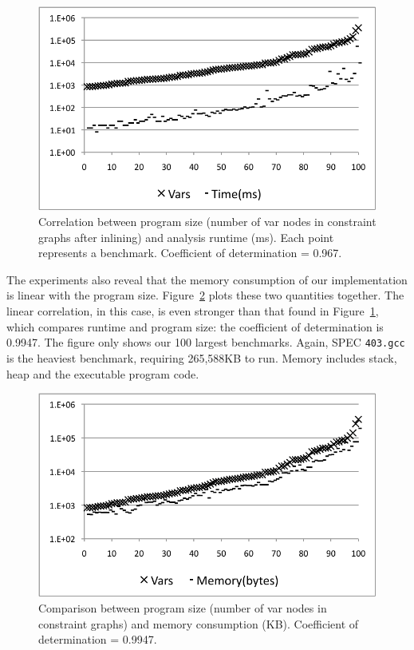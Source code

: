 \documentclass[preprint]{sigplanconf}[10pt]
\begin{document}
\begin{figure}[t!]
\begin{center}
\includegraphics[width=\columnwidth]{images/TimeCorr}
\end{center}
\caption{\label{fig:TimeCorr}
Correlation between program size (number of var nodes in constraint
graphs after inlining) and analysis runtime (ms).
Each point represents a benchmark.
Coefficient of determination = 0.967.
}
\end{figure}

The experiments also reveal that the memory consumption of our implementation
is linear with the program size.
Figure~\ref{fig:MemCorr} plots these two quantities together.
The linear correlation, in this case, is even stronger than that found in
Figure~\ref{fig:TimeCorr}, which compares runtime and program size: the
coefficient of determination is 0.9947.
The figure only shows our 100 largest benchmarks.
Again, SPEC \texttt{403.gcc} is the heaviest benchmark, requiring
265,588KB to run.
Memory includes stack, heap and the executable program code.

\begin{figure}[t!]
\begin{center}
\includegraphics[width=\columnwidth]{images/MemCorr}
\end{center}
\caption{\label{fig:MemCorr}
Comparison between program size (number of var nodes in constraint
graphs) and memory consumption (KB).
Coefficient of determination = 0.9947.
}
\end{figure}
\end{document}
